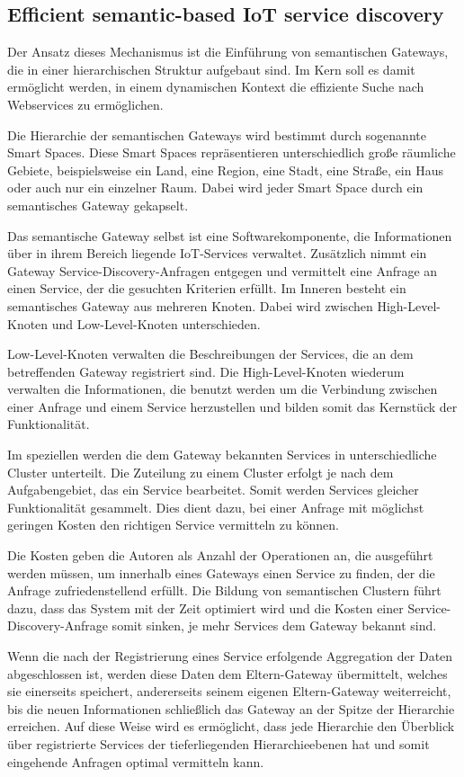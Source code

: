 \documentclass[conference,compsoc]{IEEEtran}
\begin{document}
\subsection{Efficient semantic-based IoT service discovery}

Der Ansatz dieses Mechanismus ist die Einführung von semantischen Gateways, die in einer hierarchischen Struktur aufgebaut sind. Im Kern soll es damit ermöglicht werden, in einem dynamischen Kontext die effiziente Suche nach Webservices zu ermöglichen.

Die Hierarchie der semantischen Gateways wird bestimmt durch sogenannte Smart Spaces. Diese Smart Spaces repräsentieren unterschiedlich große räumliche Gebiete, beispielsweise ein Land, eine Region, eine Stadt, eine Straße, ein Haus oder auch nur ein einzelner Raum. Dabei wird jeder Smart Space durch ein semantisches Gateway gekapselt.

Das semantische Gateway selbst ist eine Softwarekomponente, die Informationen über in ihrem Bereich liegende IoT-Services verwaltet. Zusätzlich nimmt ein Gateway Service-Discovery-Anfragen entgegen und vermittelt eine Anfrage an einen Service, der die gesuchten Kriterien erfüllt. Im Inneren besteht ein semantisches Gateway aus mehreren Knoten. Dabei wird zwischen High-Level-Knoten und Low-Level-Knoten unterschieden.

Low-Level-Knoten verwalten die Beschreibungen der Services, die an dem betreffenden Gateway registriert sind. Die High-Level-Knoten wiederum verwalten die Informationen, die benutzt werden um die Verbindung zwischen einer Anfrage und einem Service herzustellen und bilden somit das Kernstück der Funktionalität.

Im speziellen werden die dem Gateway bekannten Services in unterschiedliche Cluster unterteilt. Die Zuteilung zu einem Cluster erfolgt je nach dem Aufgabengebiet, das ein Service bearbeitet. Somit werden Services gleicher Funktionalität gesammelt. Dies dient dazu, bei einer Anfrage mit möglichst geringen Kosten den richtigen Service vermitteln zu können. 

Die Kosten geben die Autoren als Anzahl der Operationen an, die ausgeführt werden müssen, um innerhalb eines Gateways einen Service zu finden, der die Anfrage zufriedenstellend erfüllt. Die Bildung von semantischen Clustern führt dazu, dass das System mit der Zeit optimiert wird und die Kosten einer Service-Discovery-Anfrage somit sinken, je mehr Services dem Gateway bekannt sind.

Wenn die nach der Registrierung eines Service erfolgende Aggregation der Daten abgeschlossen ist, werden diese Daten dem Eltern-Gateway übermittelt, welches sie einerseits speichert, andererseits seinem eigenen Eltern-Gateway weiterreicht, bis die neuen Informationen schließlich das Gateway an der Spitze der Hierarchie erreichen. Auf diese Weise wird es ermöglicht, dass jede Hierarchie den Überblick über registrierte Services der tieferliegenden Hierarchieebenen hat und somit eingehende Anfragen optimal vermitteln kann.
\end{document}
